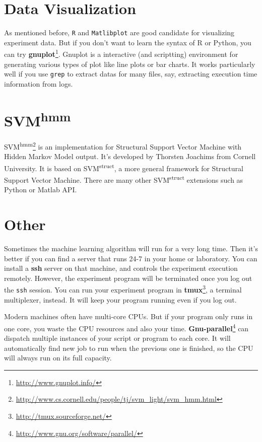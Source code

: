 \section*{Data Visualization}
As mentioned before, \texttt{R} and \texttt{Matlibplot} are good candidate for visualizing experiment data. But if you don't want to learn the syntax of R or Python, you can try \textbf{gnuplot}\footnote{\url{http://www.gnuplot.info/}}. Gnuplot is a interactive (and scriptting) environment for generating various types of plot like line plots or bar charts. It works particularly well if you use \texttt{grep} to extract datas for many files, say, extracting execution time information from logs.

\section*{SVM\textsuperscript{hmm}}
SVM\textsuperscript{hmm}\footnote{\url{http://www.cs.cornell.edu/people/tj/svm_light/svm_hmm.html}} is an implementation for Structural Support Vector Machine with Hidden Markov Model output. It's developed by Thorsten Joachims from Cornell University. It is based on SVM\textsuperscript{struct}, a more general framework for Structural Support Vector Machine. There are many other SVM\textsuperscript{struct} extensions such as Python or Matlab API.
   

\section*{Other}
Sometimes the machine learning algorithm will run for a very long time. Then it's better if you can find a server that runs 24-7 in your home or laboratory. You can install a \textbf{ssh} server on that machine, and controls the experiment execution remotely. However, the experiment program will be terminated once you log out the \texttt{ssh} session. You can run your experiment program in \textbf{tmux}\footnote{\url{http://tmux.sourceforge.net/}}, a terminal multiplexer, instead. It will keep your program running even if you log out.

Modern machines often have multi-core CPUs. But if your program only runs in one core, you waste the CPU resources and also your time. \textbf{Gnu-parallel}\footnote{\url{http://www.gnu.org/software/parallel/}} can dispatch multiple instances of your script or program to each core. It will automatically find new job to run when the previous one is finished, so the CPU will always run on its full capacity. 


